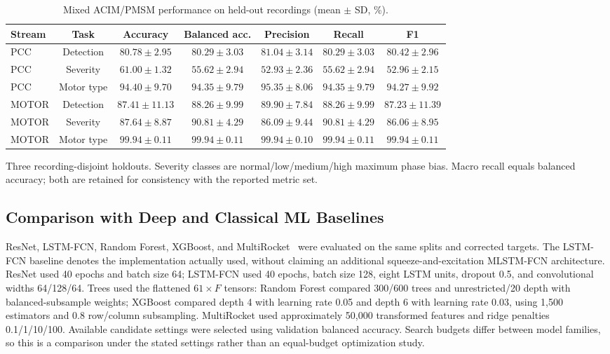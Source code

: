 \documentclass[letterpaper,journal]{IEEEtran}
\begin{document}
\begin{table}[t]
\centering
\footnotesize
\caption{Mixed ACIM/PMSM performance on held-out recordings (mean $\pm$ SD, \%).}
\label{tab:all_tasks_in_domain}
\renewcommand{\arraystretch}{1.12}
\setlength{\tabcolsep}{3pt}
\begin{tabular}{lcccccc}
\hline
Stream & Task & Accuracy & Balanced acc. & Precision & Recall & F1 \\
\hline
PCC & Detection & $80.78\pm2.95$ & $80.29\pm3.03$ & $81.04\pm3.14$ & $80.29\pm3.03$ & $80.42\pm2.96$ \\
PCC & Severity & $61.00\pm1.32$ & $55.62\pm2.94$ & $52.93\pm2.36$ & $55.62\pm2.94$ & $52.96\pm2.15$ \\
PCC & Motor type & $94.40\pm9.70$ & $94.35\pm9.79$ & $95.35\pm8.06$ & $94.35\pm9.79$ & $94.27\pm9.92$ \\
MOTOR & Detection & $87.41\pm11.13$ & $88.26\pm9.99$ & $89.90\pm7.84$ & $88.26\pm9.99$ & $87.23\pm11.39$ \\
MOTOR & Severity & $87.64\pm8.87$ & $90.81\pm4.29$ & $86.09\pm9.44$ & $90.81\pm4.29$ & $86.06\pm8.95$ \\
MOTOR & Motor type & $99.94\pm0.11$ & $99.94\pm0.11$ & $99.94\pm0.10$ & $99.94\pm0.11$ & $99.94\pm0.11$ \\
\hline
\end{tabular}
\par\smallskip\begin{minipage}{\linewidth}\footnotesize Three recording-disjoint holdouts. Severity classes are normal/low/medium/high maximum phase bias. Macro recall equals balanced accuracy; both are retained for consistency with the reported metric set.\end{minipage}
\end{table}

\subsection{Comparison with Deep and Classical ML Baselines}
\label{sec:model_comparison}

ResNet, LSTM-FCN, Random Forest, XGBoost, and MultiRocket~\cite{tan2022multirocket} were evaluated on the same splits and corrected targets. The LSTM-FCN baseline denotes the implementation actually used, without claiming an additional squeeze-and-excitation MLSTM-FCN architecture. ResNet used 40 epochs and batch size 64; LSTM-FCN used 40 epochs, batch size 128, eight LSTM units, dropout 0.5, and convolutional widths 64/128/64. Trees used the flattened $61\times F$ tensors: Random Forest compared 300/600 trees and unrestricted/20 depth with balanced-subsample weights; XGBoost compared depth 4 with learning rate 0.05 and depth 6 with learning rate 0.03, using 1,500 estimators and 0.8 row/column subsampling. MultiRocket used approximately 50,000 transformed features and ridge penalties 0.1/1/10/100. Available candidate settings were selected using validation balanced accuracy. Search budgets differ between model families, so this is a comparison under the stated settings rather than an equal-budget optimization study.
\end{document}
